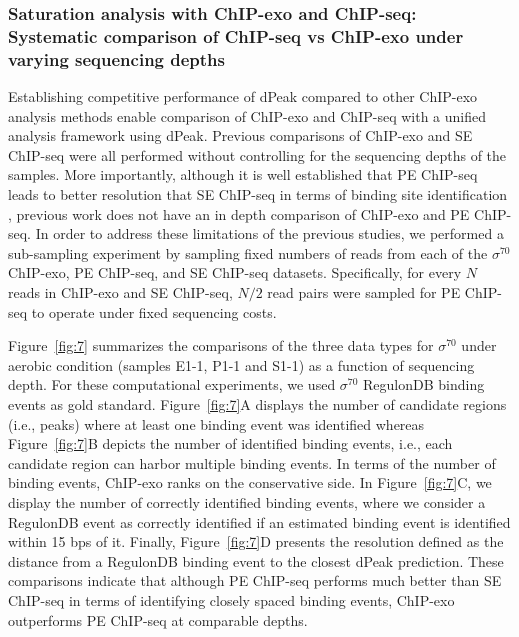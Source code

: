 \documentclass{bmcart}
\newcommand{\sig}{\sigma^{70}}
\begin{document}
\subsubsection*{Saturation analysis with ChIP-exo and ChIP-seq: Systematic comparison of ChIP-seq vs ChIP-exo under
  varying sequencing depths}
Establishing competitive performance of dPeak compared to other
ChIP-exo analysis methods enable comparison of ChIP-exo and ChIP-seq
with a unified analysis framework using dPeak. Previous comparisons of
ChIP-exo and SE ChIP-seq were all performed without controlling for
the sequencing depths of the samples. More importantly, although it is
well established that PE ChIP-seq leads to better resolution that SE
ChIP-seq in terms of binding site identification \cite{zhang16},
previous work does not have an in depth comparison of ChIP-exo and PE
ChIP-seq.
In order to address these limitations of the previous studies, we
performed a sub-sampling experiment by sampling fixed numbers of reads
from each of the $\sig$ ChIP-exo, PE ChIP-seq, and SE ChIP-seq
datasets. Specifically, for every $N$ reads in ChIP-exo and SE
ChIP-seq, $N/2$ read pairs were sampled for PE ChIP-seq to operate
under fixed sequencing costs.

Figure~\ref{fig:7} summarizes the comparisons of the three data
types for $\sig$ under aerobic condition (samples E1-1, P1-1 and S1-1)
as a function of sequencing depth. For these computational
experiments, we used $\sig$ RegulonDB \cite{regulondb} binding events
as gold standard.  Figure~\ref{fig:7}A displays the number of
candidate regions (i.e., peaks) where at least one binding event was
identified whereas Figure~\ref{fig:7}B depicts the number of
identified binding events, i.e., each candidate region can harbor
multiple binding events.  In terms of the number of binding events,
ChIP-exo ranks on the conservative side.  In Figure~\ref{fig:7}C,
we display the number of correctly identified binding events, where we
consider a RegulonDB event as correctly identified if an estimated
binding event is identified within 15 bps of it. Finally,
Figure~\ref{fig:7}D presents the resolution defined as the
distance from a RegulonDB binding event to the closest dPeak
prediction. These comparisons indicate that although PE ChIP-seq
performs much better than SE ChIP-seq in terms of identifying closely
spaced binding events, ChIP-exo outperforms PE ChIP-seq at comparable
depths.
\end{document}
